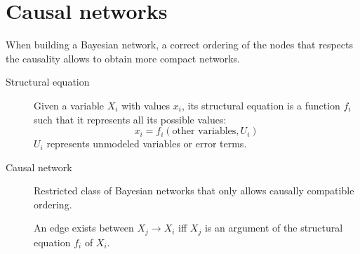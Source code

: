 \section{Causal networks}
When building a Bayesian network, a correct ordering of the nodes 
that respects the causality allows to obtain more compact networks.

\begin{description}
    \item[Structural equation] 
        Given a variable $X_i$ with values $x_i$, its structural equation is a function $f_i$
        such that it represents all its possible values:
        \[ x_i = f_i(\text{other variables}, U_i) \]
        $U_i$ represents unmodeled variables or error terms.

    \item[Causal network] 
        Restricted class of Bayesian networks that only allows causally compatible ordering.

        An edge exists between $X_j \rightarrow X_i$ iff $X_j$ is an argument of 
        the structural equation $f_i$ of $X_i$.


\end{description}
